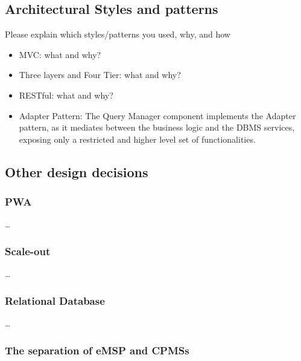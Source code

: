 \subsection{Architectural Styles and patterns}
Please explain which styles/patterns you used, why, and how

\begin{itemize}
    \item MVC: what and why?
    \item Three layers and Four Tier: what and why?
    \item RESTful: what and why?
    \item Adapter Pattern: The Query Manager component implements the Adapter pattern, as it mediates between the
    business logic and the DBMS services, exposing only a restricted and higher level set of functionalities.
\end{itemize}
\subsection{Other design decisions}
\subsubsection{PWA}
\dots
\subsubsection{Scale-out}
\dots
\subsubsection{Relational Database}
\dots
\subsubsection{The separation of eMSP and CPMSs}